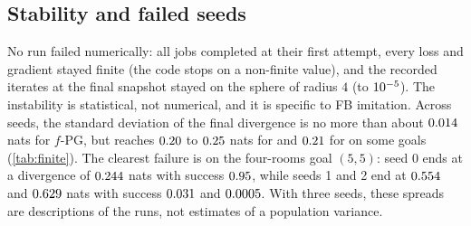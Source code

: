 \subsection{Stability and failed seeds}

No run failed numerically: all  jobs completed at their first attempt, every loss and gradient stayed finite (the code stops on a non-finite value), and the recorded \DMFB{} iterates at the final snapshot stayed on the sphere of radius $4$ (to $\vn{s11.sphere_tol}{10^{-5}}$).
The instability is statistical, not numerical, and it is specific to FB imitation.
Across seeds, the standard deviation of the final divergence is no more than about $\vn{s11.sd.fpg_max}{0.014}$ nats for $f$-PG, but reaches $\vn{s11.sd.dm_third}{0.20}$ to $\vn{s11.sd.dm_max}{0.25}$ nats for \DMFB{} and $\vn{s11.sd.er_max}{0.21}$ for \ERFB{} on some goals (\cref{tab:finite}).
The clearest failure is \DMFB{} on the four-rooms goal $(5,5)$: seed 0 ends at a divergence of $\vn{s11.dm55.js0}{0.244}$ nats with success $\vn{s11.dm55.succ0}{0.95}$, while seeds 1 and 2 end at $\vn{s11.dm55.js1}{0.554}$ and $\vn{s11.dm55.js2}{0.629}$ nats with success $\vn{s11.dm55.succ1}{0.031}$ and $\vn{s11.dm55.succ2}{0.0005}$.
With three seeds, these spreads are descriptions of the runs, not estimates of a population variance.
